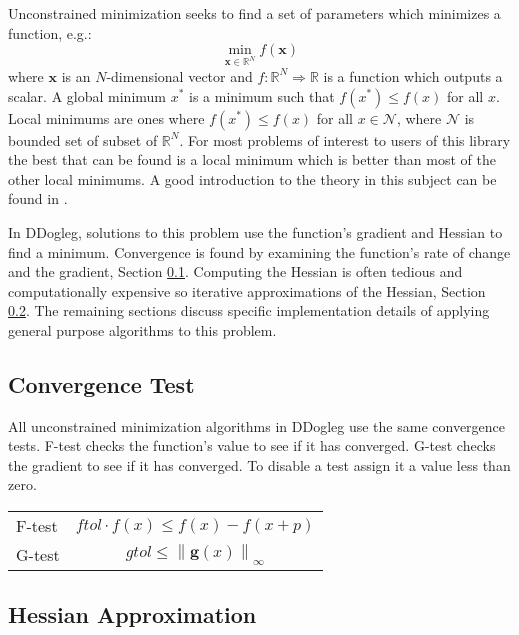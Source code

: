 \documentclass[peerreview,compsoc,onecolumn]{IEEEtran}
\newcommand{\R}{\mathbb{R}}
\newcommand{\norm}[1]{\left\lVert#1\right\rVert}
\begin{document}
Unconstrained minimization seeks to find a set of parameters which minimizes a function, e.g.:
\begin{equation}
\min\limits_{\bm{x} \in \R^N} f(\bm{x})
\end{equation}
where $\bm{x}$ is an $N$-dimensional vector and $f : \R^N \Rightarrow \R $ is a function which outputs a scalar. A global minimum $x^*$ is a minimum such that $f(x^*) \le f(x)$ for all $x$. Local minimums are ones where $f(x^*) \le f(x)$ for all $x \in \mathcal{N}$, where $\mathcal{N}$ is bounded set of subset of $\R^N$. For most problems of interest to users of this library the best that can be found is a local minimum which is better than most of the other local minimums. A good introduction to the theory in this subject can be found in \cite{numopt2006}.

In DDogleg, solutions to this problem use the function's gradient and Hessian to find a minimum. Convergence is found by examining the function's rate of change and the gradient, Section \ref{sec:unmin_convergence}. Computing the Hessian is often tedious and computationally expensive so iterative approximations of the Hessian, Section \ref{sec:hessian_approx}. The remaining sections discuss specific implementation details of applying general purpose algorithms to this problem.

\subsection{Convergence Test}
\label{sec:unmin_convergence}

All unconstrained minimization algorithms in DDogleg use the same convergence tests. F-test checks the function's value to see if it has converged. G-test checks the gradient to see if it has converged. To disable a test assign it a value less than zero.

\begin{center}
\begin{tabular}{lc}
F-test & $ftol \cdot f(x)  \leq f(x) - f(x+p)$ \\
G-test & $gtol \leq \norm{\bm{g}(x)}_\infty$ \\
\end{tabular}
\end{center}
 
\subsection{Hessian Approximation}
\label{sec:hessian_approx}
\end{document}
